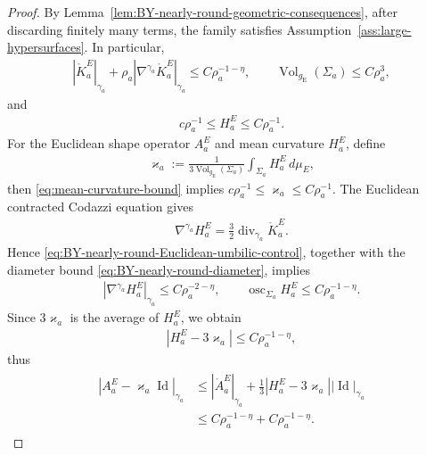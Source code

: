 \documentclass[10pt]{amsart}
\newcommand{\gE}{g_{\mathrm{E}}}
\newcommand{\Vol}{\operatorname{Vol}}
\newcommand{\Id}{\operatorname{Id}}
\theoremstyle{plain}
\theoremstyle{remark}
\begin{document}
	
	\begin{proof}
		By Lemma~\ref{lem:BY-nearly-round-geometric-consequences}, after
		discarding finitely many terms, the family satisfies Assumption~\ref{ass:large-hypersurfaces}. In particular,
		\begin{align}
			\label{eq:BY-nearly-round-Euclidean-umbilic-control}
			\left|\mathring K_a^E\right|_{\gamma_a}
			+
			\rho_a
			\left|\nabla^{\gamma_a}\mathring K_a^E\right|_{\gamma_a}
			\leq
			C\rho_a^{-1-\eta},
			\qquad
			\Vol_{\gE}(\Sigma_a)\leq C\rho_a^3,
		\end{align}
		and
		\begin{align}
			c\rho_a^{-1}\leq H_a^E\leq C\rho_a^{-1}.
		\end{align}
		For the Euclidean shape operator $A_a^E$ and mean curvature $H^E_a$, define
		\begin{align*}
			\varkappa_a
			:=
			\frac{1}{3\Vol_{\gE}(\Sigma_a)}
			\int_{\Sigma_a}H_a^E\,d\mu_E,
		\end{align*}
		then \eqref{eq:mean-curvature-bound} implies $c\rho_a^{-1}\leq \varkappa_a\leq C\rho_a^{-1}$. The Euclidean contracted Codazzi equation gives
		\begin{align*}
			\nabla^{\gamma_a}H_a^E
			=
			\frac32\operatorname{div}_{\gamma_a}\mathring K_a^E .
		\end{align*}
		Hence \eqref{eq:BY-nearly-round-Euclidean-umbilic-control}, together
		with the diameter bound \eqref{eq:BY-nearly-round-diameter}, implies
		\begin{align*}
			\left|\nabla^{\gamma_a}H_a^E\right|_{\gamma_a}
			\leq C\rho_a^{-2-\eta},
			\qquad
			\operatorname{osc}_{\Sigma_a}H_a^E
			\leq C\rho_a^{-1-\eta}.
		\end{align*}
		Since $3\varkappa_a$ is the average of $H_a^E$, we obtain
		\begin{align*}
			|H_a^E-3\varkappa_a|\leq C\rho_a^{-1-\eta},
		\end{align*}
		thus
		\begin{align}\label{eq:BY-nearly-round-A-close-umbilic}
			\begin{split}
				\left|A_a^E-\varkappa_a\Id\right|_{\gamma_a}
				&\leq
				\left|\mathring A_a^E\right|_{\gamma_a}
				+
				\frac13
				\left|H_a^E-3\varkappa_a\right|
				\left|\Id\right|_{\gamma_a}  \\
				&\leq
				C\rho_a^{-1-\eta}
				+
				C\rho_a^{-1-\eta}.
			\end{split}
		\end{align}
		

\end{proof}
\end{document}
